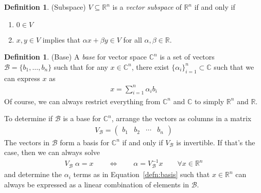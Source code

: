 \documentclass[12pt]{article}
\numberwithin{equation}{section} %
\theoremstyle{plain}
\theoremstyle{definition}
\newtheorem{defn}[thm]{Definition}
\theoremstyle{remark}
\newcommand{\R}{\mathbb{R}}
\newcommand{\Rn}{\mathbb{R}^n}
\newcommand{\C}{\mathbb{C}}
\newcommand{\Cn}{\mathbb{C}^n}
\begin{document}
\begin{defn}{(Subspace)}
$V\subseteq \Rn$ is a \emph{vector subspace} of $\Rn$ if and only if
\begin{enumerate}
  \item $0 \in V$
  \item $x,y\in V$ implies that $\alpha x + \beta y \in V$ for all
    $\alpha,\beta\in \R$.
\end{enumerate}
\end{defn}

\begin{defn}{(Base)}
A \emph{base} for vector space $\Cn$ is a set of vectors
$\mathcal{B}=\{b_1,\ldots,b_n\}$ such that for any $x\in \Cn$, there
exist $\{\alpha_i\}_{i=1}^n \subset \C$ such that we can express $x$ as
\begin{align}
  x = \sum^n_{i=1} \alpha_i b_i
  \label{defn:basis}
\end{align}
Of course, we can always restrict everything from $\Cn$ and $\C$ to
simply $\Rn$ and $\R$.

To determine if $\mathcal{B}$ is a base for $\Cn$, arrange the vectors
as columns in a matrix
\begin{align*}
  V_\mathcal{B} = \begin{pmatrix} b_1 & b_2 &\cdots & b_n \end{pmatrix}
\end{align*}
The vectors in $\mathcal{B}$ form a basis for $\Cn$ if and only if
$V_\mathcal{B}$ is invertible. If that's the case, then we can always
solve
\begin{align*}
  V_\mathcal{B} \;\alpha = x
  \qquad\Leftrightarrow\qquad
  \alpha = V_\mathcal{B}^{-1} x
  \qquad \forall x\in \Rn
\end{align*}
and determine the $\alpha_i$ terms as in Equation~\ref{defn:basis} such
that $x \in \Rn$ can always be expressed as a linear combination of
elements in $\mathcal{B}$.
\end{defn}
\end{document}
